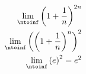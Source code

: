 
\begin{align}
    \lim_{\ntoinf} \left( 1 + \frac{1}{n} \right)^{2n} \\
    \lim_{\ntoinf} \left( \left( 1 + \frac{1}{n} \right)^n \right)^2 \\
    \lim_{\ntoinf} \left( e \right)^2 = e^2 \\
\end{align}

\pagebreak